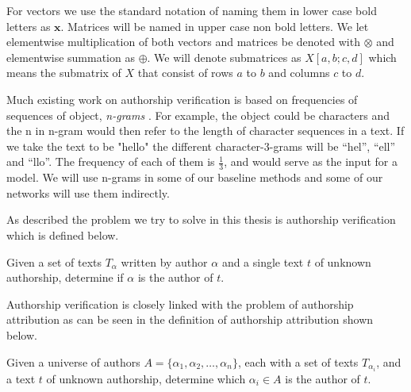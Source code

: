 For vectors we use the standard notation of naming them in lower case bold
letters as $\mathbf{x}$. Matrices will be named in upper case non bold
letters. We let elementwise multiplication of both vectors and matrices be
denoted with $\otimes$ and elementwise summation as $\oplus$. We will denote
submatrices as $X[a,b;c,d]$ which means the submatrix of $X$ that consist of
rows $a$ to $b$ and columns $c$ to $d$.

Much existing work on authorship verification is based on frequencies of
sequences of object, \textit{n-grams} \citep{stamatos2009}. For example, the
object could be characters and the n in n-gram would then refer to the length of
character sequences in a text. If we take the text to be "hello" the different
character-3-grams will be ``hel'', ``ell'' and ``llo''. The frequency of each
of them is $\frac{1}{3}$, and would serve as the input for a model. We will use
n-grams in some of our baseline methods and some of our networks will use them
indirectly.


As described the problem we try to solve in this thesis is authorship
verification which is defined below.

\begin{definition}
    \label{def:authorship_verification}

    Given a set of texts $T_\alpha$ written by author $\alpha$ and a single text
    $t$ of unknown authorship, determine if $\alpha$ is the author of $t$.

\end{definition}

Authorship verification is closely linked with the problem of authorship
attribution as can be seen in the definition of authorship attribution shown
below.

\begin{definition}

    Given a universe of authors $A = \{\alpha_1, \alpha_2,\dots,\alpha_n\}$,
    each with a set of texts $T_{\alpha_i}$, and a text $t$ of unknown
    authorship, determine which $\alpha_i \in A$ is the author of $t$.

\end{definition}

